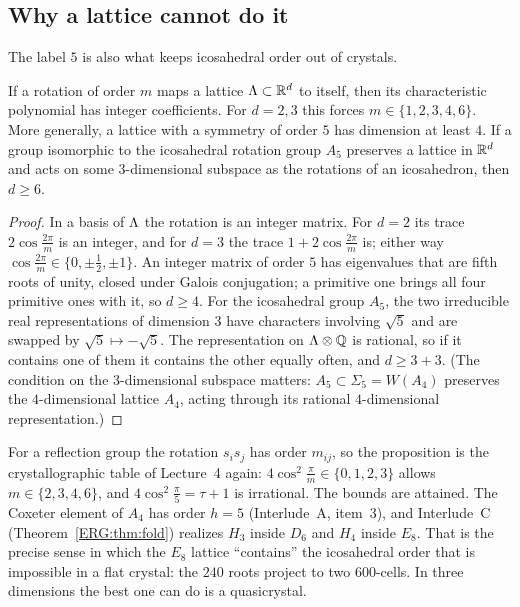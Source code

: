 \subsection*{Why a lattice cannot do it}
The label $5$ is also what keeps icosahedral order out of crystals.

\begin{proposition}\label{DYN:prop:cryst}
If a rotation of order $m$ maps a lattice $\Lambda\subset\mathbb{R}^d$ to itself, then its characteristic
polynomial has integer coefficients. For $d=2,3$ this forces $m\in\{1,2,3,4,6\}$. More generally, a
lattice with a symmetry of order $5$ has dimension at least $4$. If a group isomorphic to the icosahedral
rotation group $A_5$ preserves a lattice in $\mathbb{R}^d$ and acts on some $3$-dimensional subspace as the
rotations of an icosahedron, then $d\ge6$.
\end{proposition}

\begin{proof}
In a basis of $\Lambda$ the rotation is an integer matrix. For $d=2$ its trace $2\cos\frac{2\pi}m$ is an
integer, and for $d=3$ the trace $1+2\cos\frac{2\pi}m$ is; either way
$\cos\frac{2\pi}m\in\{0,\pm\frac12,\pm1\}$. An integer matrix of order $5$ has eigenvalues that are fifth
roots of unity, closed under Galois conjugation; a primitive one brings all four primitive ones with it,
so $d\ge4$. For the icosahedral group $A_5$, the two irreducible real representations of dimension $3$ have
characters involving $\sqrt5$ and are swapped by $\sqrt5\mapsto-\sqrt5$. The representation on
$\Lambda\otimes\mathbb{Q}$ is rational, so if it contains one of them it contains the other equally often, and
$d\ge3+3$. (The condition on the $3$-dimensional subspace matters: $A_5\subset\Sigma_5=W(A_4)$ preserves the
$4$-dimensional lattice $A_4$, acting through its rational $4$-dimensional representation.)
\end{proof}

For a reflection group the rotation $s_is_j$ has order $m_{ij}$, so the proposition is the
crystallographic table of Lecture~4 again: $4\cos^2\frac\pi m\in\{0,1,2,3\}$ allows
$m\in\{2,3,4,6\}$, and $4\cos^2\frac\pi5=\tau+1$ is irrational. The bounds are attained. The Coxeter
element of $A_4$ has order $h=5$ (Interlude~A, item~3), and Interlude~C (Theorem~\ref{ERG:thm:fold})
realizes $H_3$ inside $D_6$ and $H_4$ inside $E_8$. That is the precise sense in which the $E_8$ lattice
``contains'' the icosahedral order that is impossible in a flat crystal: the $240$ roots project to two
$600$-cells. In three dimensions the best one can do is a quasicrystal.

